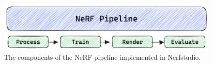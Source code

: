 \begin{figure}[!h]
    \centering
    \includegraphics[width=1.0\textwidth]{figures/nerfstudio-pipeline.png}
    \caption{The components of the NeRF pipeline implemented in Nerfstudio.}
    \label{fig:nerfstudio-pipeline}
\end{figure}